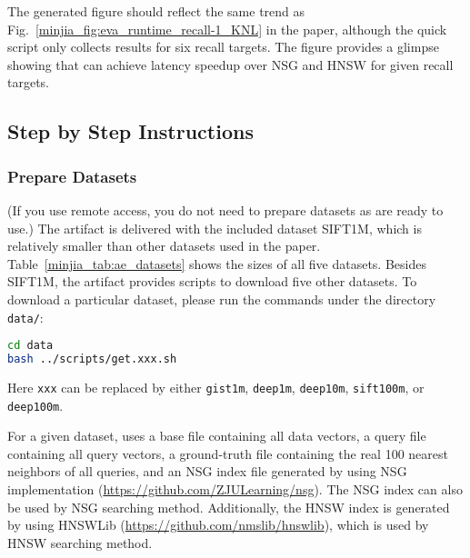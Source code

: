 The generated figure should reflect the same trend as Fig.~\ref{minjia_fig:eva_runtime_recall-1_KNL} in the paper, although the quick script only collects results for six recall targets. The figure provides a glimpse showing that \Hammer can achieve latency speedup over NSG and HNSW for given recall targets.


\subsection{Step by Step Instructions}

\subsubsection{Prepare Datasets}

(If you use remote access, you do not need to prepare datasets as are ready to use.) The artifact is delivered with the included dataset SIFT1M, which is relatively smaller than other datasets used in the paper. 
Table~\ref{minjia_tab:ae_datasets} shows the sizes of all five datasets. 
Besides SIFT1M, the artifact provides scripts to download five other datasets. To download a particular dataset, please run the commands under the directory \verb|data/|:
\begin{lstlisting}[language=bash]
cd data
bash ../scripts/get.xxx.sh
\end{lstlisting}
Here \verb|xxx| can be replaced by either \verb|gist1m|, \verb|deep1m|, \verb|deep10m|, \verb|sift100m|, or \verb|deep100m|.


For a given dataset, \Hammer uses a base file containing all data vectors, a query file containing all query vectors, a ground-truth file containing the real 100 nearest neighbors of all queries, and an NSG index file generated by using NSG implementation (\url{https://github.com/ZJULearning/nsg}). 
The NSG index can also be used by NSG searching method.
Additionally, the HNSW index is generated by using HNSWLib (\url{https://github.com/nmslib/hnswlib}), which is used by HNSW searching method.


